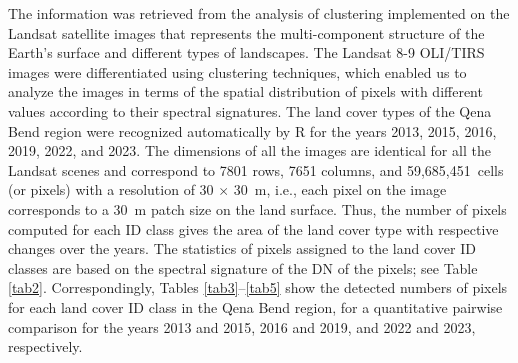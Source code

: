 \documentclass[information,article,accept,pdftex,moreauthors]{Definitions/mdpi}
\begin{document}
{The information was retrieved from the analysis of clustering implemented on the Landsat satellite images that represents the multi-component structure of the Earth's surface and different types of landscapes. }The Landsat 8-9 OLI/TIRS images were differentiated {using clustering techniques, which enabled us to analyze the images in terms of the spatial distribution of pixels with different values according to their spectral signatures. The }land cover types of the Qena Bend region were recognized automatically by R for the years 2013, 2015, 2016, 2019, 2022, and 2023. The dimensions of all the images are identical for all the Landsat scenes and correspond to 7801 rows, 7651 columns, and 59,685,451~cells (or pixels) with a resolution of 30 $\times$ %
 30~m, i.e., each pixel on the image corresponds to a 30~m patch size on the land surface. Thus, the number of pixels computed for each ID class gives the area of the land cover type with respective changes over the years. The statistics of pixels assigned to the land cover ID classes are based on the spectral signature of the DN of the pixels; see Table \ref{tab2}. {Correspondingly}, Tables \ref{tab3}--\ref{tab5} show the detected numbers of pixels for each land cover ID class  in the Qena Bend region, for a quantitative pairwise comparison for the years 2013 and 2015, 2016 and 2019, and 2022 and 2023, respectively. 
\end{document}
